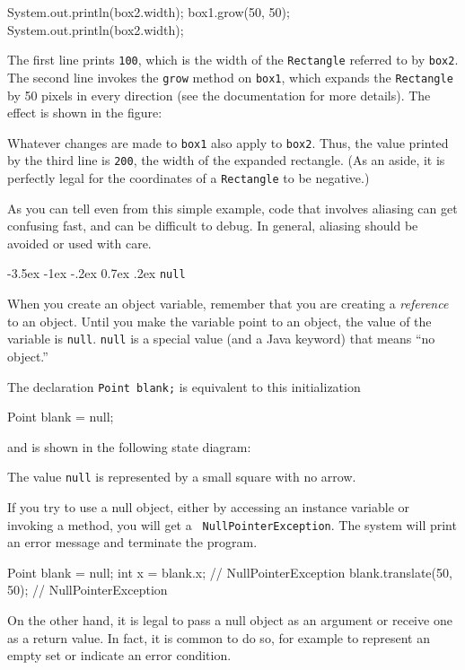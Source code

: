 \documentclass{book}
\makeatletter
\renewcommand{\section}{\@startsection 
    {section} {1} {0mm}%
    {-3.5ex \@plus -1ex \@minus -.2ex}%
    {0.7ex \@plus.2ex}%
    {\normalfont\Large\bfseries}}
\makeatother
\begin{document}
\begin{verbatimtab}
    System.out.println(box2.width);
    box1.grow(50, 50);
    System.out.println(box2.width);
\end{verbatimtab}
%
The first line prints {\tt 100}, which is the width of the
{\tt Rectangle} referred to by {\tt box2}.  The second
line invokes the {\tt grow} method on {\tt box1}, which
expands the {\tt Rectangle} by 50 pixels in every direction
(see the documentation for more details).  The effect
is shown in the figure:




Whatever changes are
made to {\tt box1} also apply to {\tt box2}.  Thus, the
value printed by the third line is {\tt 200}, the width of
the expanded rectangle. (As an aside, it is perfectly legal
for the coordinates of a {\tt Rectangle} to be negative.)

As you can tell even from this simple example, code that
involves aliasing can get confusing fast, and can be
difficult to debug.  In general, aliasing should be avoided
or used with care.


\section {{\tt null}}

When you create an object variable, remember that you are
creating a {\em reference} to an object.  Until you make
the variable point to an object, the value of the variable
is {\tt null}.  {\tt null} is a special value (and
a Java keyword) that means ``no object.''

The declaration {\tt Point blank;} is equivalent to this
initialization

\begin{verbatimtab}
    Point blank = null;
\end{verbatimtab}
%
and is shown in the following state diagram:




The value {\tt null} is represented by a small square with no arrow.


If you try to use a null object, either by accessing an instance
variable or invoking a method, you will get a {\tt
NullPointerException}.  The system will print an error message
and terminate the program.

\begin{verbatimtab}
    Point blank = null;
    int x = blank.x;              // NullPointerException
    blank.translate(50, 50);      // NullPointerException
\end{verbatimtab}
%
On the other hand, it is legal to pass a null object as an argument or
receive one as a return value.  In fact, it is common to do so, for
example to represent an empty set or indicate an error condition.
\end{document}
